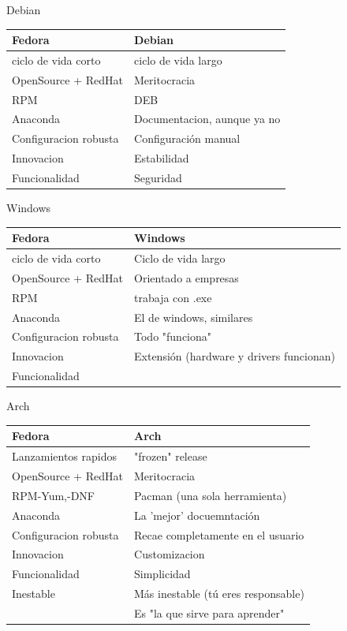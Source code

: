 \documentclass[presentation]{beamer}
\begin{document}
\begin{frame}[label=sec-21]{Debian}
\begin{center}
\begin{tabular}{ll}
Fedora & Debian\\
\hline
ciclo de vida corto & ciclo de vida largo\\
OpenSource + RedHat & Meritocracia\\
RPM & DEB\\
Anaconda & Documentacion, aunque ya no\\
Configuracion robusta & Configuración manual\\
Innovacion & Estabilidad\\
Funcionalidad & Seguridad\\
\end{tabular}
\end{center}
\end{frame}




\begin{frame}[label=sec-22]{Windows}
\begin{center}
\begin{tabular}{ll}
Fedora & Windows\\
\hline
ciclo de vida corto & Ciclo de vida largo\\
OpenSource + RedHat & Orientado a empresas\\
RPM & trabaja con .exe\\
Anaconda & El de windows, similares\\
Configuracion robusta & Todo "funciona"\\
Innovacion & Extensión (hardware y drivers funcionan)\\
Funcionalidad & $$$$\\
\end{tabular}
\end{center}
\end{frame}


\begin{frame}[label=sec-23]{Arch}
\begin{center}
\begin{tabular}{ll}
Fedora & Arch\\
\hline
Lanzamientos  rapidos & "frozen" release\\
OpenSource + RedHat & Meritocracia\\
RPM-Yum,-DNF & Pacman (una sola herramienta)\\
Anaconda & La 'mejor' docuemntación\\
Configuracion robusta & Recae completamente en el usuario\\
Innovacion & Customizacion\\
Funcionalidad & Simplicidad\\
Inestable & Más inestable (tú eres responsable)\\
 & Es "la que sirve para aprender"\\
\end{tabular}
\end{center}
\end{frame}
\end{document}
